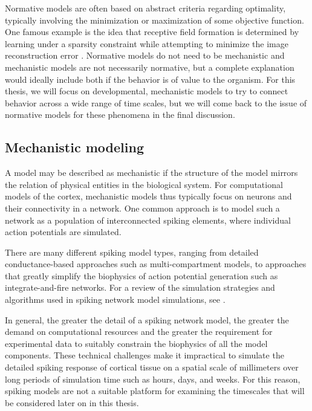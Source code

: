 \documentclass[phd,ianc,twoside]{infthesis}
\begin{document}
Normative models are often based on abstract criteria regarding
optimality, typically involving the minimization or maximization of
some objective function. One famous example is the idea that receptive
field formation is determined by learning under a sparsity constraint
while attempting to minimize the image reconstruction error
\citep{olshausen_nature96}. Normative models do not need to be
mechanistic and mechanistic models are not necessarily normative, but a
complete explanation would ideally include both if the behavior is of
value to the organism. For this thesis, we will focus on
developmental, mechanistic models to try to connect behavior across a
wide range of time scales, but we will come back to the issue
of normative models for these phenomena in the final discussion.

\subsection{Mechanistic modeling}

A model may be described as mechanistic if the structure of the model
mirrors the relation of physical entities in the biological system. For
computational models of the cortex, mechanistic models thus typically
focus on neurons and their connectivity in a network. One common approach is to
model such a network as a population of interconnected spiking elements,
where individual action potentials are simulated.

There are many different spiking model types, ranging from detailed
conductance-based approaches such as multi-compartment models, to
approaches that greatly simplify the biophysics of action potential generation
such as integrate-and-fire networks. For a review of the simulation
strategies and algorithms used in spiking network model simulations, see
\citet{romain_jcn07}.

In general, the greater the detail of a spiking network model, the
greater the demand on computational resources and the greater the
requirement for experimental data to suitably constrain the biophysics
of all the model components. These technical challenges make it
impractical to simulate the detailed spiking response of cortical tissue on a spatial
scale of millimeters over long periods of simulation time such as hours,
days, and weeks. For this reason, spiking models are not a suitable
platform for examining the timescales that will be considered later on
in this thesis.
\end{document}
